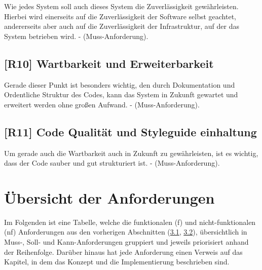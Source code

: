 Wie jedes System soll auch dieses System die Zuverlässigkeit gewährleisten. Hierbei wird einerseits auf die Zuverlässigkeit der Software selbst geachtet, andererseits aber auch auf die Zuverlässigkeit der Infrastruktur, auf der das System betrieben wird. - (Muss-Anforderung).

\subsection{[R10] Wartbarkeit und Erweiterbarkeit}

Gerade dieser Punkt ist besonders wichtig, den durch Dokumentation und Ordentliche Struktur des Codes, kann das System in Zukunft gewartet und erweitert werden ohne großen Aufwand. - (Muss-Anforderung).

\subsection{[R11] Code Qualität und Styleguide einhaltung}

Um gerade auch die Wartbarkeit auch in Zukunft zu gewährleisten, ist es wichtig, dass der Code sauber und gut strukturiert ist. - (Muss-Anforderung).

\section{Übersicht der Anforderungen}
\label{chapter:3-section:uebersicht-anforderungen}

Im Folgenden ist eine Tabelle, welche die funktionalen (f) und nicht-funktionalen (nf) Anforderungen aus den vorherigen Abschnitten (\hyperref[chapter:3-section:funktionale-anforderungen]{3.1}, \hyperref[chapter:3-section:nichtfunktionale-anforderungen]{3.2}), übersichtlich in Muss-, Soll- und Kann-Anforderungen gruppiert und jeweils priorisiert anhand der Reihenfolge. Darüber hinaus hat jede Anforderung einen Verweis auf das Kapitel, in dem das Konzept und die Implementierung beschrieben sind.

